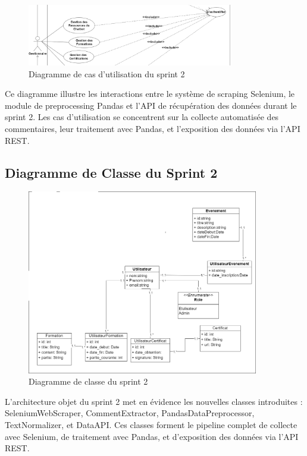 \begin{figure}[H]
\centering
\includegraphics[width=0.8\textwidth]{assets/images/sprint2-usecase.png}
\caption{Diagramme de cas d'utilisation du sprint 2}
\label{fig:sprint2-usecase}
\end{figure}

Ce diagramme illustre les interactions entre le système de scraping Selenium, le module de preprocessing Pandas et l'API de récupération des données durant le sprint 2. Les cas d'utilisation se concentrent sur la collecte automatisée des commentaires, leur traitement avec Pandas, et l'exposition des données via l'API REST.

\subsection{Diagramme de Classe du Sprint 2}

\begin{figure}[H]
\centering
\includegraphics[width=0.9\textwidth]{assets/images/sprint2-class.png}
\caption{Diagramme de classe du sprint 2}
\label{fig:sprint2-class}
\end{figure}

L'architecture objet du sprint 2 met en évidence les nouvelles classes introduites : SeleniumWebScraper, CommentExtractor, PandasDataPreprocessor, TextNormalizer, et DataAPI. Ces classes forment le pipeline complet de collecte avec Selenium, de traitement avec Pandas, et d'exposition des données via l'API REST.


